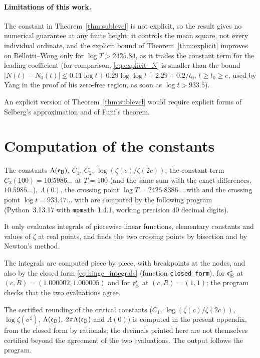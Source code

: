 \documentclass[11pt,a4paper]{article}
\makeatletter
\numberwithin{equation}{section}
\DeclareRobustCommand{\CGref}[1]{\ref{#1}}
\DeclareRobustCommand{\CGeqref}[1]{\eqref{#1}}
\DeclareRobustCommand{\CGcite}[2][]{\if\relax\detokenize{#1}\relax\cite{#2}\else\cite[#1]{#2}\fi}
\let\CG@origref\ref
\let\CG@origeqref\eqref
\newcommand{\CG@gettip}[1]{\@ifundefined{CGTip@#1}{#1}{\csname CGTip@#1\endcsname}}
\newcommand{\CG@getbib}[1]{\@ifundefined{CGBib@#1}{#1}{\csname CGBib@#1\endcsname}}
\DeclareRobustCommand{\CGref}[1]{\pdftooltip{\CG@origref{#1}}{\CG@gettip{#1}}}
\DeclareRobustCommand{\CGeqref}[1]{\pdftooltip{\CG@origeqref{#1}}{\CG@gettip{#1}}}
\DeclareRobustCommand{\CGcite}[2][]{\pdftooltip{\if\relax\detokenize{#1}\relax\cite{#2}\else\cite[#1]{#2}\fi}{\CG@getbib{#2}}}
\theoremstyle{definition}
\theoremstyle{remark}
\newcommand{\Nz}{N_0} %
\newcommand{\eB}{\mathfrak e_{\rm B}}
\newcommand{\eE}{\mathfrak e_{\rm E}}
\makeatother
\begin{document}
\paragraph{Limitations of this work.}
The constant in Theorem~\CGref{thm:sublevel} is not explicit, so the result gives no numerical guarantee at any finite height; it controls the mean square, not every individual ordinate, and the explicit bound of Theorem~\CGref{thm:explicit} improves on Bellotti--Wong only for $\log T>2425.84$, as it trades the constant term for the leading coefficient (for comparison, \CGeqref{eq:explicit_N} is smaller than the bound $|N(t)-\Nz(t)|\le0.11\log t+0.29\log\log t+2.29+0.2/t_0$, $t\ge t_0\ge e$, used by Yang \CGcite[(4.29)]{Yang2024} in the proof of his zero-free region, as soon as $\log t>933.5$).

An explicit version of Theorem~\CGref{thm:sublevel} would require explicit forms of Selberg's approximation and of Fujii's theorem.

\appendix
\section{Computation of the constants}\label{app:code}
The constants $\Lambda(\eB)$, $C_1$, $C_2$, $\log(\zeta(c)/\zeta(2c))$, the constant term $C_3(100)=10.5986\ldots$ at $T=100$ (and the same sum with the exact differences, $10.5985\ldots$), $\Lambda(0)$, the crossing point $\log T=2425.8386\ldots$ with \CGcite{BellottiWong2025} and the crossing point $\log t=933.47\ldots$ with \CGcite[(4.29)]{Yang2024} are computed by the following program (Python~3.13.17 with \texttt{mpmath}~1.4.1, working precision $40$ decimal digits).

It only evaluates integrals of piecewise linear functions, elementary constants and values of $\zeta$ at real points, and finds the two crossing points by bisection and by Newton's method.

The integrals are computed piece by piece, with breakpoints at the nodes, and also by the closed form \CGeqref{eq:hinge_integrals} (function \texttt{closed\_form}), for $\eE^*$ at $(c,R)=(1.000002,1.000005)$ and for $\eB^*$ at $(c,R)=(1,1)$; the program checks that the two evaluations agree.

The certified rounding of the critical constants ($C_1$, $\log(\zeta(c)/\zeta(2c))$, $\log\zeta(\sigma^\sharp)$, $\Lambda(\eB)$, $2\pi\Lambda(\eB)$ and $\Lambda(0)$) is computed in the present appendix, from the closed form by rationals; the decimals printed here are not themselves certified beyond the agreement of the two evaluations. The output follows the program.
\end{document}
